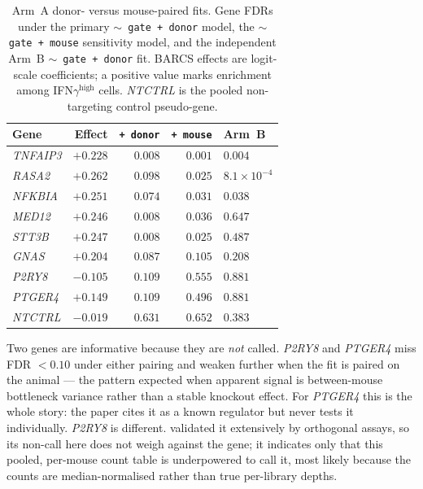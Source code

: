 \begin{table}[htbp]
\centering
\caption{Arm~A donor- versus mouse-paired fits.  Gene FDRs under the primary
\texttt{$\sim$ gate + donor} model, the \texttt{$\sim$ gate + mouse} sensitivity
model, and the independent Arm~B \texttt{$\sim$ gate + donor} fit.  BARCS effects
are logit-scale coefficients; a positive value marks enrichment among
IFN$\gamma^\text{high}$ cells.  \textit{NTCTRL} is the pooled non-targeting
control pseudo-gene.}
\label{tab:liu}
\small
\setlength{\tabcolsep}{6pt}
\begin{tabular}{lrrrl}
\toprule
Gene & Effect & \texttt{+ donor} & \texttt{+ mouse} & Arm~B\\
\midrule
\textit{TNFAIP3} & $+0.228$ & $0.008$ & $0.001$ & $0.004$\\
\textit{RASA2}   & $+0.262$ & $0.098$ & $0.025$ & $8.1\times10^{-4}$\\
\textit{NFKBIA}  & $+0.251$ & $0.074$ & $0.031$ & $0.038$\\
\textit{MED12}   & $+0.246$ & $0.008$ & $0.036$ & $0.647$\\
\textit{STT3B}   & $+0.247$ & $0.008$ & $0.025$ & $0.487$\\
\textit{GNAS}    & $+0.204$ & $0.087$ & $0.105$ & $0.208$\\
\textit{P2RY8}   & $-0.105$ & $0.109$ & $0.555$ & $0.881$\\
\textit{PTGER4}  & $+0.149$ & $0.109$ & $0.496$ & $0.881$\\
\textit{NTCTRL}  & $-0.019$ & $0.631$ & $0.652$ & $0.383$\\
\bottomrule
\end{tabular}
\end{table}

Two genes are informative because they are \emph{not} called.  \textit{P2RY8}
and \textit{PTGER4} miss FDR $<0.10$ under either pairing and weaken further when
the fit is paired on the animal --- the pattern expected when apparent signal is
between-mouse bottleneck variance rather than a stable knockout effect.  For
\textit{PTGER4} this is the whole story: the paper cites it as a known regulator
but never tests it individually.  \textit{P2RY8} is different.
\citet{liu2026invivo} validated it extensively by orthogonal assays, so its
non-call here does not weigh against the gene; it indicates only that this
pooled, per-mouse count table is underpowered to call it, most likely because
the counts are median-normalised rather than true per-library depths.

